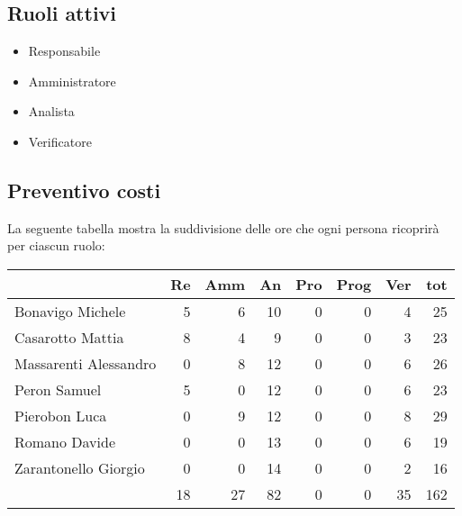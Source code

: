 \subsection{Ruoli attivi}
\begin{itemize}
    \item Responsabile 
    \item Amministratore 
    \item Analista 
    \item Verificatore
\end{itemize}

\subsection{Preventivo costi}

La seguente tabella mostra la suddivisione delle ore che ogni persona ricoprirà per ciascun ruolo:

\begin{table}[ht]
    \begin{tabularx}{\linewidth}{X|rrrrrrr}
    \rowcolor{gray!30}& Re & Amm & An & Pro & Prog & Ver & tot \\
    \hline
    Bonavigo Michele                        & 5 & 6 & 10 & 0 & 0 & 4 & 25 \\
    \rowcolor{gray!10}Casarotto Mattia      & 8 & 4 & 9 & 0 & 0 & 3 & 23 \\
    Massarenti Alessandro                   & 0 & 8 & 12 & 0 & 0 & 6 & 26 \\
    \rowcolor{gray!10}Peron Samuel          & 5 & 0 & 12 & 0 & 0 & 6 & 23 \\
    Pierobon Luca                           & 0 & 9 & 12 & 0 & 0 & 8 & 29 \\
    \rowcolor{gray!10}Romano Davide         & 0 & 0 & 13 & 0 & 0 & 6 & 19 \\
    Zarantonello Giorgio                    & 0 & 0 & 14 & 0 & 0 & 2 & 16 \\
    \hline                                  & 18 & 27 & 82 & 0 & 0 & 35 & 162 \\ 
    \end{tabularx}
\end{table}

